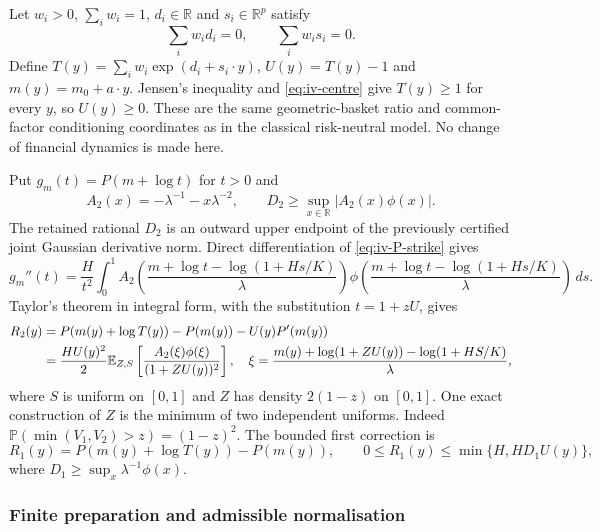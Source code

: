 Let $w_i>0$, $\sum_iw_i=1$, $d_i\in\mathbb R$ and
$s_i\in\mathbb R^p$ satisfy
\begin{equation}
 \sum_iw_id_i=0,\qquad \sum_iw_is_i=0.
 \label{eq:iv-centre}
\end{equation}
Define $T(y)=\sum_iw_i\exp(d_i+s_i\cdot y)$,
$U(y)=T(y)-1$ and $m(y)=m_0+a\cdot y$.  Jensen's inequality and
\eqref{eq:iv-centre} give $T(y)\geq1$ for every $y$, so $U(y)\geq0$.
These are the same geometric-basket ratio and common-factor conditioning
coordinates as in the classical risk-neutral model.  No change of financial
dynamics is made here.

Put $g_m(t)=P(m+\log t)$ for $t>0$ and
\begin{equation}
 A_2(x)=-\lambda^{-1}-x\lambda^{-2},\qquad
 D_2\geq\sup_{x\in\mathbb R}|A_2(x)\phi(x)|.
 \label{eq:iv-A2}
\end{equation}
The retained rational $D_2$ is an outward upper endpoint of the previously
certified joint Gaussian derivative norm.  Direct differentiation of
\eqref{eq:iv-P-strike} gives
\begin{equation}
 g_m''(t)=\frac{H}{t^2}\int_0^1
 A_2\!\left(\frac{m+\log t-\log(1+Hs/K)}{\lambda}\right)
 \phi\!\left(\frac{m+\log t-\log(1+Hs/K)}{\lambda}\right)\,ds.
 \label{eq:iv-g2}
\end{equation}
Taylor's theorem in integral form, with the substitution $t=1+zU$, gives
\begin{align}
 R_2(y)&=P(m(y)+\log T(y))-P(m(y))-U(y)P'(m(y))\notag\\
 &=\frac{HU(y)^2}{2}\mathbb E_{Z,S}
 \left[\frac{A_2(\xi)\phi(\xi)}{(1+ZU(y))^2}\right],
 \quad \xi=\frac{m(y)+\log(1+ZU(y))-\log(1+HS/K)}{\lambda},
 \label{eq:iv-R2-identity}
\end{align}
where $S$ is uniform on $[0,1]$ and $Z$ has density $2(1-z)$ on $[0,1]$.
One exact construction of $Z$ is the minimum of two independent uniforms.
Indeed $\mathbb P(\min(V_1,V_2)>z)=(1-z)^2$.
The bounded first correction is
\begin{equation}
 R_1(y)=P(m(y)+\log T(y))-P(m(y)),\qquad
 0\leq R_1(y)\leq \min\{H,HD_1U(y)\},
 \label{eq:iv-R1}
\end{equation}
where $D_1\geq\sup_x\lambda^{-1}\phi(x)$.

\subsubsection{Finite preparation and admissible normalisation}

